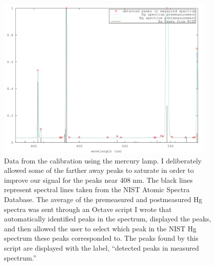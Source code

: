 \begin{figure}
\centering
\includegraphics[width=0.95\textwidth]{calibrationData} 
\caption[Calibration spectrum from Hg Lamp]{\label{calibrationData} Data from the calibration using the mercury lamp. I deliberately allowed some of the farther away peaks to saturate in order to improve our signal for the peaks near 408 nm. The black lines represent spectral lines taken from the NIST Atomic Spectra Database\cite{NISTasd}. The average of the premeasured and postmeasured Hg spectra was sent through an Octave script I wrote that automatically identified peaks in the spectrum, displayed the peaks, and then allowed the user to select which peak in the NIST Hg spectrum these peaks corresponded to. The peaks found by this script are displayed with the label, ``detected peaks in measured spectrum.''}
\end{figure}

